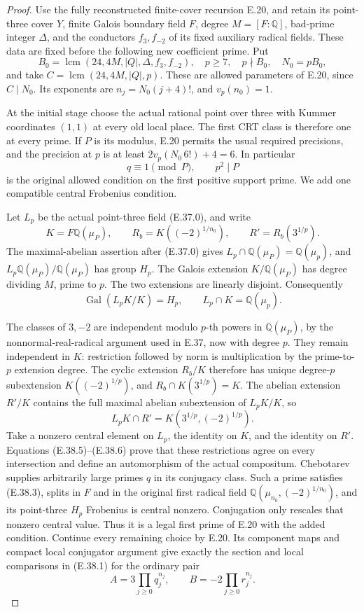 \begin{proof}
Use the fully reconstructed finite-cover recursion E.20, and
retain its point-three cover $Y$, finite Galois boundary field
$F$, degree $M=[F:\mathbb Q]$, bad-prime integer $\Delta$, and
the conductors $f_3,f_{-2}$ of its fixed auxiliary radical fields.
These data are fixed before the following new coefficient prime.
Put
\[
 B_0=\operatorname{lcm}(24,4M,|Q|,\Delta,f_3,f_{-2}),
 \quad p\ge7,\quad p\nmid B_0,\quad N_0=pB_0,
 \tag{E.38.2}
\]
and take $C=\operatorname{lcm}(24,4M,|Q|,p)$.  These are allowed
parameters of E.20, since $C\mid N_0$.  Its exponents are
$n_j=N_0(j+4)!$, and $v_p(n_0)=1$.

At the initial stage choose the actual rational point over three
with Kummer coordinates $(1,1)$ at every old local place.
The first CRT class is therefore one at every prime.  If $P$ is
its modulus, E.20 permits the usual required precisions, and the
precision at $p$ is at least
$2v_p(N_0\,6!)+4=6$.  In particular
\[
                    q\equiv1\pmod P,\qquad p^2\mid P
 \tag{E.38.3}
\]
is the original allowed condition on the first positive support
prime.  We add one compatible central Frobenius condition.

Let $L_p$ be the actual point-three field (E.37.0), and write
\[
 K=F\mathbb Q(\mu_P),\qquad
 R_b=K((-2)^{1/n_0}),\qquad R'=R_b(3^{1/p}).
 \tag{E.38.4}
\]
The maximal-abelian assertion after (E.37.0) gives
$L_p\cap\mathbb Q(\mu_P)=\mathbb Q(\mu_p)$, and
$L_p\mathbb Q(\mu_P)/\mathbb Q(\mu_P)$ has group $H_p$.
The Galois extension $K/\mathbb Q(\mu_P)$ has degree dividing
$M$, prime to $p$.  The two extensions are linearly disjoint.
Consequently
\[
 \operatorname{Gal}(L_pK/K)=H_p,\qquad
                  L_p\cap K=\mathbb Q(\mu_p).
 \tag{E.38.5}
\]

The classes of $3,-2$ are independent modulo $p$-th powers in
$\mathbb Q(\mu_P)$, by the nonnormal-real-radical argument used
in E.37, now with degree $p$.  They remain independent in $K$:
restriction followed by norm is multiplication by the
prime-to-$p$ extension degree.  The cyclic extension $R_b/K$
therefore has unique degree-$p$ subextension
$K((-2)^{1/p})$, and
$R_b\cap K(3^{1/p})=K$.  The abelian extension $R'/K$ contains
the full maximal abelian subextension of $L_pK/K$, so
\[
                   L_pK\cap R'=K(3^{1/p},(-2)^{1/p}).
 \tag{E.38.6}
\]
Take a nonzero central element on $L_p$, the identity on $K$,
and the identity on $R'$.  Equations (E.38.5)--(E.38.6) prove
that these restrictions agree on every intersection and define
an automorphism of the actual compositum.  Chebotarev supplies
arbitrarily large primes $q$ in its conjugacy class.  Such a
prime satisfies (E.38.3), splits in $F$ and in the original
first radical field
$\mathbb Q(\mu_{n_0},(-2)^{1/n_0})$, and its point-three
$H_p$ Frobenius is central nonzero.  Conjugation only rescales
that nonzero central value.  Thus it is a legal first prime of
E.20 with the added condition.  Continue every remaining choice
by E.20.  Its component maps and compact local conjugator argument
give exactly the section and local comparisons in (E.38.1)
for the ordinary pair
\[
             A=3\prod_{j\ge0}q_j^{n_j},\qquad
             B=-2\prod_{j\ge0}r_j^{n_j}.
 \tag{E.38.7}
\]


\end{proof}
